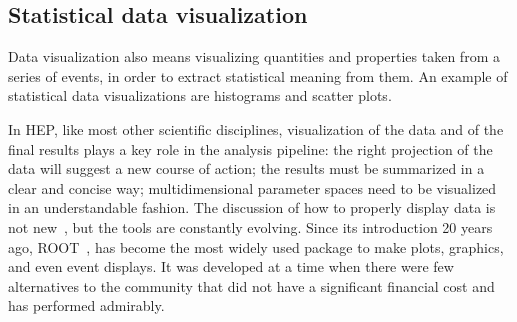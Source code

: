\documentclass[12pt,a4paper]{article}
\begin{document}



\hypertarget{statistical-data-visualization}{%
\subsection{Statistical data visualization}\label{statistical-data-visualization}}

Data visualization also means visualizing quantities and properties taken from a series of events, in order to extract statistical
meaning from them. An example of statistical data visualizations are histograms and scatter plots.

In HEP, like most other scientific disciplines, visualization of the data and of the final results plays a key role in the
analysis pipeline: the right projection of the data will suggest a new course of action; the results must be summarized in a
clear and concise way; multidimensional parameter spaces need to be visualized in an understandable fashion. The discussion
of how to properly display data is not new~\cite{Tufte1986}, but the tools are constantly evolving. Since its introduction 20 years ago,
ROOT~\cite{Root1997}, has become the most widely used package to make plots, graphics, and even event displays. It was developed at a
time when there were few alternatives to the community that did not have a significant financial cost and has performed admirably.
\end{document}
